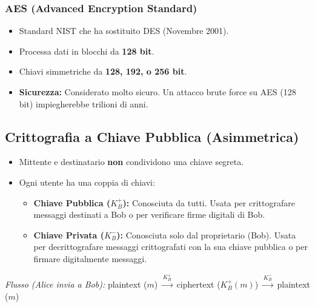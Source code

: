 \documentclass{article}
\begin{document}
\subsubsection{AES (Advanced Encryption Standard)}
\begin{itemize}
    \item Standard NIST che ha sostituito DES (Novembre 2001).
    \item Processa dati in blocchi da \textbf{128 bit}.
    \item Chiavi simmetriche da \textbf{128, 192, o 256 bit}.
    \item \textbf{Sicurezza:} Considerato molto sicuro. Un attacco brute force su AES (128 bit) impiegherebbe trilioni di anni.
\end{itemize}

\subsection{Crittografia a Chiave Pubblica (Asimmetrica)}
\begin{itemize}
    \item Mittente e destinatario \textbf{non} condividono una chiave segreta.
    \item Ogni utente ha una coppia di chiavi:
    \begin{itemize}
        \item \textbf{Chiave Pubblica ($K_B^+$):} Conosciuta da tutti. Usata per crittografare messaggi destinati a Bob o per verificare firme digitali di Bob.
        \item \textbf{Chiave Privata ($K_B^-$):} Conosciuta solo dal proprietario (Bob). Usata per decrittografare messaggi crittografati con la sua chiave pubblica o per firmare digitalmente messaggi.
    \end{itemize}
\end{itemize}
\textit{Flusso (Alice invia a Bob):} plaintext ($m$) $\xrightarrow{K_B^+}$ ciphertext ($K_B^+(m)$) $\xrightarrow{K_B^-}$ plaintext ($m$)
\end{document}
